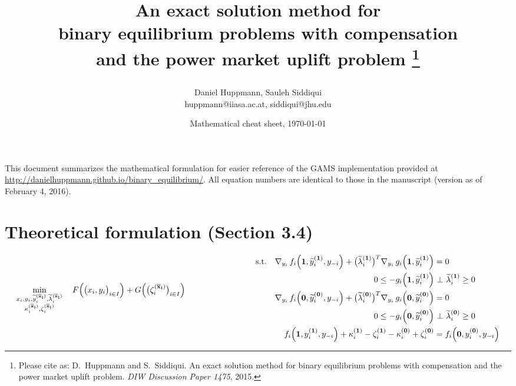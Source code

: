\documentclass[9pt,a4paper]{article}
\title{\Large An exact solution method for \\ binary equilibrium problems with compensation \\ 
	and the power market uplift problem%
	\thanks{Please cite as: \newline D.~Huppmann and S.~Siddiqui. An exact solution method for binary equilibrium problems with compensation and the power market uplift problem. \emph{DIW Discussion Paper 1475}, 2015.}
\author{\normalsize Daniel Huppmann, Sauleh Siddiqui \\
	\small huppmann@iiasa.ac.at, siddiqui@jhu.edu
}
\date{\normalsize Mathematical cheat sheet, \today}
}
\newcommand{\st}{\text{s.t.} \quad}
\newcommand{\upfixedx}{^{\mathbf{(\overline{x}_i)}}}
\newcommand{\one}{\mathbf{1}}
\newcommand{\zero}{\mathbf{0}}
\newcommand{\upone}{^{\mathbf{(1)}}}
\newcommand{\upzero}{^{\mathbf{(0)}}}
\begin{document}
\maketitle

This document summarizes the mathematical formulation for easier reference of the GAMS implementation provided at \url{http://danielhuppmann.github.io/binary_equilibrium/}. All equation numbers are identical to those in the manuscript (version as of February 4, 2016).

\section*{Theoretical formulation (Section 3.4)}

\setcounter{equation}{13}
\begin{subequations} \label{model:overall:problem}
\begin{align}
\min_{
\substack{x_i,y_i,
\widetilde{y}\upfixedx_i,\widetilde{\lambda}\upfixedx_i \\  \kappa\upfixedx_i,\zeta\upfixedx_i}}
\quad F\Big(\big(x_i,y_i\big)_{i \in I}\Big) + G\Big(\big(\zeta\upfixedx_i\big)_{i \in I}\Big) \hspace{3 cm} \label{model:overall:problem:objective}
\end{align}
\vspace{-0.5 cm}\begin{align}
\st \nabla_{y_i} \, f_i\Big(\one,\widetilde{y}_i\upone,y_{-i}\Big) + \big(\widetilde{\lambda}_i\upone\big)^T \nabla_{y_i} \, g_i\Big(\one,\widetilde{y}_i\upone\Big) &= 0 \label{model:overall:problem:KKT:1}\\
%
0 \leq - g_i\Big(\one,\widetilde{y}_i\upone \Big)& \ \bot \ \widetilde{\lambda}_i\upone \geq 0 \label{model:overall:problem:KKT:constraints:1} \\
\nabla_{y_i} \, f_i\Big(\zero,\widetilde{y}_i\upzero,y_{-i}\Big) + \big(\widetilde{\lambda}_i\upzero\big)^T \nabla_{y_i} \, g_i\Big(\zero,\widetilde{y}_i\upzero\Big) &= 0 \label{model:overall:problem:KKT:0}\\
%
0 \leq - g_i\Big(\zero,\widetilde{y}_i\upzero \Big)& \ \bot \ \widetilde{\lambda}_i\upzero \geq 0 \label{model:overall:problem:KKT:constraints:0} \\
f_i\Big(\one,y_i\upone,y_{-i}\Big) + \kappa_i\upone - \zeta_i\upone - \kappa_i\upzero + \zeta_i\upzero&= f_i\Big(\zero,y_i\upzero,y_{-i}\Big) \label{model:overall:problem:incentive} \\

\end{align}
\end{subequations}
\end{document}
